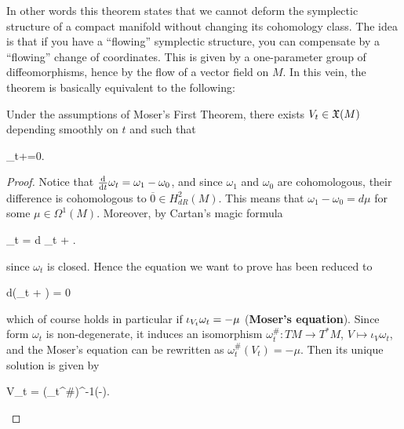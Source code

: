 \documentclass[main.tex]{subfiles}
\begin{document}
In other words this theorem states that we cannot deform the symplectic structure of a compact manifold without changing its cohomology class. The idea is that if you have a ``flowing'' symplectic structure, you can compensate by a ``flowing'' change of coordinates. This is given by a one-parameter group of diffeomorphisms, hence by the flow of a vector field on $M$. In this vein, the theorem is basically equivalent to the following:

\begin{lemma}
	Under the assumptions of Moser's First Theorem, there exists $V_t \in \mathfrak{X}(M)$ depending smoothly on $t$ and such that
	\begin{eqalign}
	\label{eq:Moser_trick}
		\omega_t+=0.
	\end{eqalign}
\end{lemma}
\begin{proof}
	Notice that $\frac{\mathrm{d}{}}{\mathrm{d}{t}} \omega_t = \omega_1-\omega_0$, and since $\omega_1$ and $\omega_0$ are cohomologous, their difference is cohomologous to $\overline 0 \in H^2_{dR}(M)$. This means that $\omega_1 -\omega_0 = d\mu$ for some $\mu \in \Omega^1(M)$. Moreover, by Cartan's magic formula\footnotemark
	\begin{eqalign}
		\omega_t = d \omega_t + \cancel{\ipr{V_t}d\omega_t}.
	\end{eqalign}
	since $\omega_t$ is closed. Hence the equation we want to prove has been reduced to
	\begin{eqalign}
		d(\omega_t + \mu) = 0
	\end{eqalign}
	which of course holds in particular if $\iota_{V_t}\omega_t = -\mu$ (\textbf{Moser's equation}). Since form $\omega_t$ is non-degenerate, it induces an isomorphism $\omega_t^\# : TM \to T^*M$, $V \mapsto \iota_V\omega_t$, and the Moser's equation can be rewritten as $\omega_t^\#(V_t) = - \mu$. Then its unique solution is given by
	\begin{eqalign}
		V_t = (\omega_t^\#)^{-1}(-\mu).
	\end{eqalign}
\end{proof}
\end{document}
